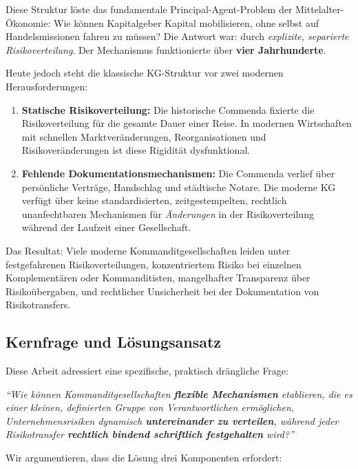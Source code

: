 \documentclass[a4paper, 12pt, twoside, openright]{report}
\theoremstyle{definition}
\theoremstyle{definition}
\begin{document}
Diese Struktur löste das fundamentale Principal-Agent-Problem der Mittelalter-Ökonomie: Wie können Kapitalgeber Kapital mobilisieren, ohne selbst auf Handelsmissionen fahren zu müssen? Die Antwort war: durch \emph{explizite, separierte Risikoverteilung}. Der Mechanismus funktionierte über \textbf{vier Jahrhunderte}.

Heute jedoch steht die klassische KG-Struktur vor zwei modernen Herausforderungen:

\begin{enumerate}
    \item \textbf{Statische Risikoverteilung:} Die historische Commenda fixierte die Risikoverteilung für die gesamte Dauer einer Reise. In modernen Wirtschaften mit schnellen Marktveränderungen, Reorganisationen und Risikoveränderungen ist diese Rigidität dysfunktional.
    
    \item \textbf{Fehlende Dokumentationsmechanismen:} Die Commenda verlief über persönliche Verträge, Handschlag und städtische Notare. Die moderne KG verfügt über keine standardisierten, zeitgestempelten, rechtlich unanfechtbaren Mechanismen für \emph{Änderungen} in der Risikoverteilung während der Laufzeit einer Gesellschaft.
\end{enumerate}

Das Resultat: Viele moderne Kommanditgesellschaften leiden unter festgefahrenen Risikoverteilungen, konzentriertem Risiko bei einzelnen Komplementären oder Kommanditisten, mangelhafter Transparenz über Risikoübergaben, und rechtlicher Unsicherheit bei der Dokumentation von Risikotransfers.

\subsection{Kernfrage und Lösungsansatz}

Diese Arbeit adressiert eine spezifische, praktisch drängliche Frage:

\begin{center}
\textit{``Wie können Kommanditgesellschaften \textbf{flexible Mechanismen} etablieren, die es einer kleinen, definierten Gruppe von Verantwortlichen ermöglichen, Unternehmensrisiken dynamisch \textbf{untereinander zu verteilen}, während jeder Risikotransfer \textbf{rechtlich bindend schriftlich festgehalten} wird?''}
\end{center}

Wir argumentieren, dass die Lösung drei Komponenten erfordert:
\end{document}

